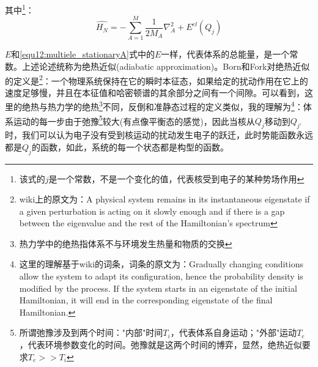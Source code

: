         其中\footnote{该式的$j$是一个常数，不是一个变化的值，代表核受到电子的某种势场作用}：
        \begin{equation}
            \hat{H_N}=-\sum_{A=1}^M\frac{1}{2M_A}\nabla^2_A+E^{el}(Q_j)
        \end{equation}
        
        $E$和\ref{equ12:multiele_stationaryA}式中的$E$一样，代表体系的总能量，是一个常数。上述论述统称为绝热近似(adiabatic approximation)。Born和Fork对绝热近似的定义是\footnote{wiki上的原文为：A physical system remains in its instantaneous eigenstate if a given perturbation is acting on it slowly enough and if there is a gap between the eigenvalue and the rest of the Hamiltonian's spectrum}：一个物理系统保持在它的瞬时本征态，如果给定的扰动作用在它上的速度足够慢，并且在本征值和哈密顿谱的其余部分之间有一个间隙。可以看到，这里的绝热与热力学的绝热\footnote{热力学中的绝热指体系不与环境发生热量和物质的交换}不同，反倒和准静态过程的定义类似，我的理解为\footnote{这里的理解基于wiki的词条，词条的原文为：Gradually changing conditions allow the system to adapt its configuration, hence the probability density is modified by the process. If the system starts in an eigenstate of the initial Hamiltonian, it will end in the corresponding eigenstate of the final Hamiltonian.}：体系运动的每一步由于弛豫\footnote{所谓弛豫涉及到两个时间："内部"时间$T_i$，代表体系自身运动；"外部"运动$T_e$，代表环境参数变化的时间。弛豫就是这两个时间的博弈，显然，绝热近似要求$T_e>>T_i$}较大(有点像平衡态的感觉)，因此当核从$Q_j$移动到$Q_{j'}$时，我们可以认为电子没有受到核运动的扰动发生电子的跃迁，此时势能函数永远都是$Q_j$的函数，如此，系统的每一个状态都是构型的函数。
        
